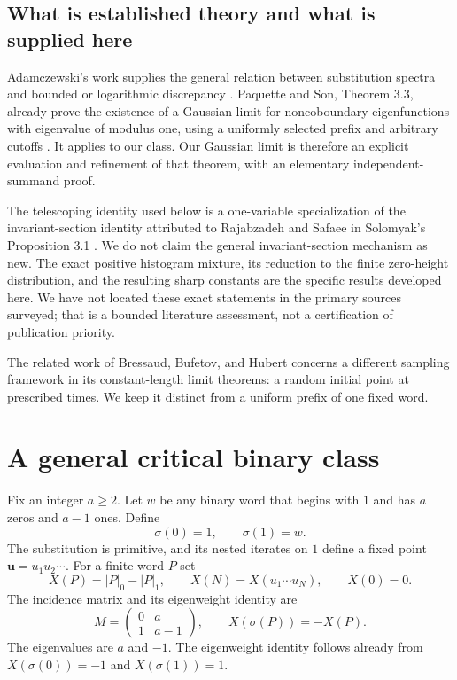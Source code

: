 \documentclass[11pt]{article}
\numberwithin{equation}{section}
\theoremstyle{definition}
\theoremstyle{remark}
\begin{document}
\subsection{What is established theory and what is supplied here}

Adamczewski's work supplies the general relation between substitution
spectra and bounded or logarithmic discrepancy
\cite{adam2003,adamczewski}. Paquette and Son, Theorem 3.3, already prove
the existence of a Gaussian limit for noncoboundary eigenfunctions
with eigenvalue of modulus one, using a uniformly selected prefix
and arbitrary cutoffs \cite{paquette}. It applies to our class.
Our Gaussian limit is therefore an explicit evaluation and refinement
of that theorem, with an elementary independent-summand proof.

The telescoping identity used below is a one-variable specialization
of the invariant-section identity attributed to Rajabzadeh and
Safaee in Solomyak's Proposition 3.1 \cite{solomyak,rajabzadeh}.
We do not claim the general invariant-section mechanism as new.
The exact positive histogram mixture, its reduction to the finite
zero-height distribution, and the resulting sharp constants are the
specific results developed here. We have not located these exact
statements in the primary sources surveyed; that is a bounded
literature assessment, not a certification of publication priority.

The related work of Bressaud, Bufetov, and Hubert
\cite{bressaud} concerns a different sampling framework in its
constant-length limit theorems: a random initial point at prescribed
times. We keep it distinct from a uniform prefix of one fixed word.

\section{A general critical binary class}\label{bmf:sec:class}

Fix an integer $a\geq2$. Let $w$ be any binary word that begins with
$1$ and has $a$ zeros and $a-1$ ones. Define
\begin{equation}\label{bmf:eq:general-sub}
 \sigma(0)=1,\qquad \sigma(1)=w.
\end{equation}
The substitution is primitive, and its nested iterates on $1$
define a fixed point $\mathbf u=u_1u_2\cdots$. For a finite word $P$ set
\begin{equation}\label{bmf:eq:weight}
 X(P)=|P|_0-|P|_1,\qquad
 X(N)=X(u_1\cdots u_N),\qquad X(0)=0.
\end{equation}
The incidence matrix and its eigenweight identity are
\begin{equation}\label{bmf:eq:matrix}
 M=\begin{pmatrix}0&a\\1&a-1\end{pmatrix},
 \qquad X(\sigma(P))=-X(P).
\end{equation}
The eigenvalues are $a$ and $-1$. The eigenweight identity follows
already from $X(\sigma(0))=-1$ and $X(\sigma(1))=1$.
\end{document}
